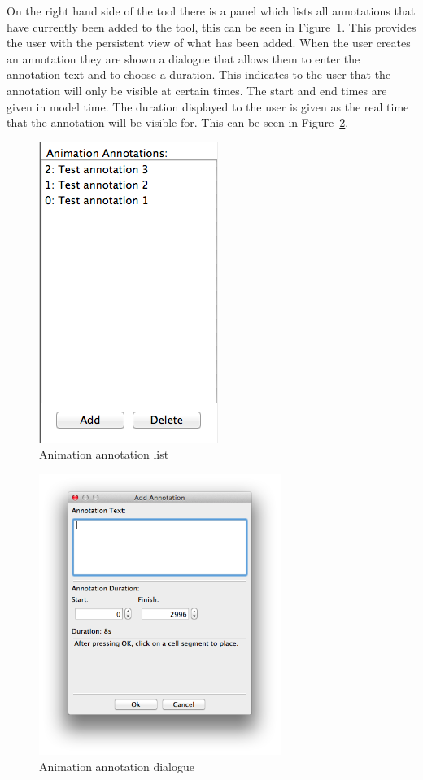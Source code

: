 On the right hand side of the tool there is a panel which lists all annotations that have currently been added to the tool, this can be seen in Figure~\ref{fig:annotation_list}.  This provides the user with the persistent view of what has been added.  When the user creates an annotation they are shown a dialogue that allows them to enter the annotation text and to choose a duration.  This indicates to the user that the annotation will only be visible at certain times.  The start and end times are given in model time.  The duration displayed to the user is given as the real time that the annotation will be visible for.  This can be seen in Figure~\ref{fig:annotation_dialog}.

\begin{figure}[h!]
    \centering
    \includegraphics[height=0.4\textheight]{images/annotation_list.png}
    \caption{Animation annotation list}
    \label{fig:annotation_list}
\end{figure}

\begin{figure}[h!]
    \centering
    \includegraphics[width=0.7\textwidth]{images/annotation_dialog.png}
    \caption{Animation annotation dialogue}
    \label{fig:annotation_dialog}
\end{figure}

